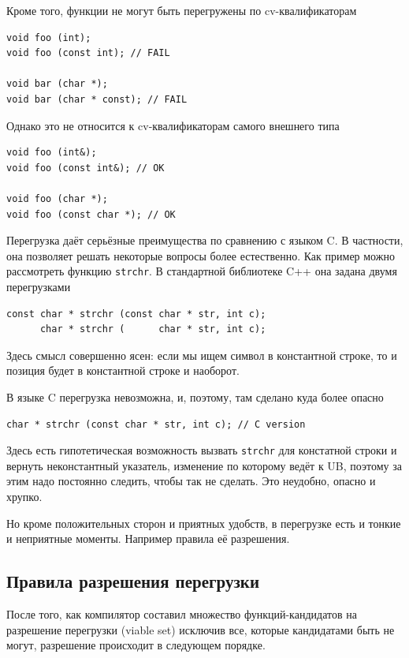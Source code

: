 \documentclass[a4paper,12pt,oneside]{book}
\begin{document}
Кроме того, функции не могут быть перегружены по cv-квалификаторам

\begin{lstlisting}
void foo (int);
void foo (const int); // FAIL

void bar (char *);
void bar (char * const); // FAIL
\end{lstlisting}

Однако это не относится к cv-квалификаторам самого внешнего типа

\begin{lstlisting}
void foo (int&);
void foo (const int&); // OK

void foo (char *);
void foo (const char *); // OK
\end{lstlisting}

Перегрузка даёт серьёзные преимущества по сравнению с языком C. В частности, она позволяет решать некоторые вопросы более естественно. Как пример можно рассмотреть функцию \lstinline!strchr!. В стандартной библиотеке C++ она задана двумя перегрузками

\begin{lstlisting}
const char * strchr (const char * str, int c);
      char * strchr (      char * str, int c);
\end{lstlisting}

Здесь смысл совершенно ясен: если мы ищем символ в константной строке, то и позиция будет в константной строке и наоборот.

В языке C перегрузка невозможна, и, поэтому, там сделано куда более опасно

\begin{lstlisting}
char * strchr (const char * str, int c); // C version
\end{lstlisting}

Здесь есть гипотетическая возможность вызвать \lstinline!strchr! для констатной строки и вернуть неконстантный указатель, изменение по которому ведёт к UB, поэтому за этим надо постоянно следить, чтобы так не сделать. Это неудобно, опасно и хрупко.

Но кроме положительных сторон и приятных удобств, в перегрузке есть и тонкие и неприятные моменты. Например правила её разрешения.

\subsection{Правила разрешения перегрузки}\label{Overloading}

После того, как компилятор составил множество функций-кандидатов на разрешение перегрузки (viable set) исключив все, которые кандидатами быть не могут, разрешение происходит в следующем порядке.
\end{document}
